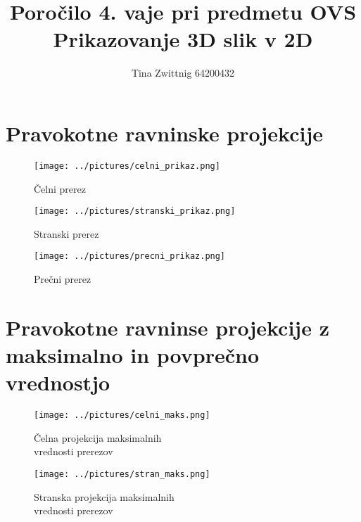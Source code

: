 \documentclass[12pt,a4paper]{article}
\author{Tina Zwittnig 64200432}
\title{Poročilo 4. vaje pri predmetu OVS \\ Prikazovanje 3D slik v 2D}
\begin{document}
\maketitle
\pagebreak
\section{Pravokotne ravninske projekcije}

\begin{figure}[!htb]
    \centering
    \begin{minipage}{.5\textwidth}
        \begin{center}
    \texttt{[image: ../pictures/celni\_prikaz.png]}
    \caption{Čelni prerez}
  \end{center}
    \end{minipage}%
    \begin{minipage}{0.5\textwidth}
        \begin{center}
    \texttt{[image: ../pictures/stranski\_prikaz.png]}
    \caption{Stranski prerez}
  \end{center}
    \end{minipage}
\end{figure}


\pagebreak
\begin{figure}[h!]
  \begin{center}
    \texttt{[image: ../pictures/precni\_prikaz.png]}
    \caption{Prečni prerez}
  \end{center}
\end{figure}
\pagebreak
\section{Pravokotne ravninse projekcije z maksimalno in povprečno vrednostjo}
\begin{figure}[!htb]
    \centering
    \begin{minipage}{.5\textwidth}
        \begin{center}
    \texttt{[image: ../pictures/celni\_maks.png]}
    \caption{Čelna projekcija maksimalnih \\ vrednosti prerezov}
  \end{center}
    \end{minipage}%
    \begin{minipage}{0.5\textwidth}
        \begin{center}
    \texttt{[image: ../pictures/stran\_maks.png]}
    \caption{Stranska projekcija maksimalnih \\ vrednosti prerezov}
  \end{center}
    \end{minipage}
\end{figure}
\end{document}
